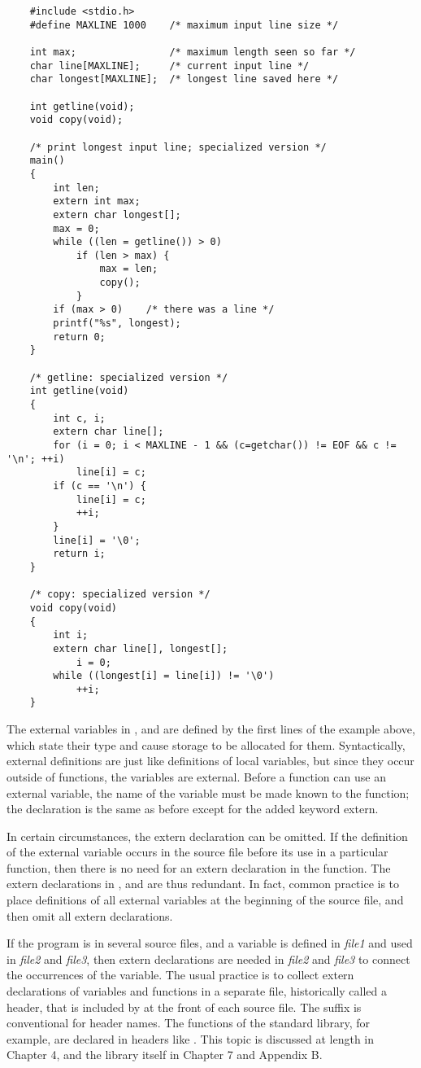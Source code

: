 \begin{lstlisting}
	#include <stdio.h>
	#define MAXLINE 1000 	/* maximum input line size */

	int max; 				/* maximum length seen so far */
	char line[MAXLINE]; 	/* current input line */
	char longest[MAXLINE]; 	/* longest line saved here */

	int getline(void);
	void copy(void);

	/* print longest input line; specialized version */
	main()
	{
		int len;
		extern int max;
		extern char longest[];
		max = 0;
		while ((len = getline()) > 0)
			if (len > max) {
				max = len;
				copy();
			}
		if (max > 0) 	/* there was a line */
		printf("%s", longest);
		return 0;
	}

	/* getline: specialized version */
	int getline(void)
	{
		int c, i;
		extern char line[];
		for (i = 0; i < MAXLINE - 1 && (c=getchar()) != EOF && c != '\n'; ++i)
			line[i] = c;
		if (c == '\n') {
			line[i] = c;
			++i;
		}
		line[i] = '\0';
		return i;
	}

	/* copy: specialized version */
	void copy(void)
	{
		int i;
		extern char line[], longest[];
			i = 0;
		while ((longest[i] = line[i]) != '\0')
			++i;
	}
\end{lstlisting}
The external variables in ,  and  are defined by the first lines of the example above, which state their type and cause storage to be allocated for them.
Syntactically, external definitions are just like definitions of local variables, but since they occur outside of functions, the variables are external.
Before a function can use an external variable, the name of the variable must be made known to the function; the declaration is the same as before except for the added keyword extern.

In certain circumstances, the extern declaration can be omitted.
If the definition of the external variable occurs in the source file before its use in a particular function, then there is no need for an extern declaration in the function.
The extern declarations in ,  and  are thus redundant.
In fact, common practice is to place definitions of all external variables at the beginning of the source file, and then omit all extern declarations.

If the program is in several source files, and a variable is defined in \emph{file1} and used in \emph{file2} and \emph{file3}, then extern declarations are needed in \emph{file2} and \emph{file3} to connect the occurrences of the variable.
The usual practice is to collect extern declarations of variables and functions in a separate file, historically called a header, that is included by  at the front of each source file.
The suffix  is conventional for header names.
The functions of the standard library, for example, are declared in headers like .
This topic is discussed at length in Chapter 4, and the library itself in Chapter 7 and Appendix B.

